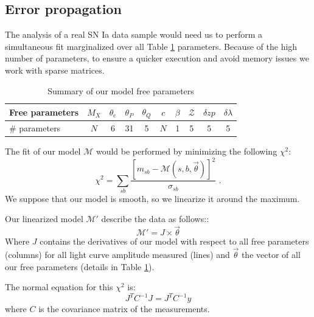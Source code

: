 \documentclass[\docopts]{\docclass}
\begin{document}

\subsection{Error propagation}
\label{sec::linalg}

The analysis of a real SN Ia data sample would need us to perform a simultaneous fit marginalized over all Table \ref{tab:params} parameters. Because of the high number of parameters, to ensure a quicker execution and avoid memory issues we work with sparse matrices.

\begin{table}[t]
\begin{center}
\label{tab:params}
\caption{Summary of our model free parameters}
\begin{tabular}{l|ccccccccc}
\hline
\hline
Free parameters & $M_X$ & $\theta_\text{c}$ & $\theta_P$ & $\theta_Q$ & $c$ & $\beta$ & $\mathcal{Z}$ & $\delta zp$ & $\delta \lambda$ \\
\hline
\# parameters & $N$ & 6 & 31 & 5 & $N$ & 1 & 5 & 5 & 5 \\
\hline
\end{tabular}
\end{center}
\end{table}

The fit of our model $\mathcal{M}$ would be performed by minimizing the following $\chi^2$:
\begin{equation}
\chi^2 = \sum_{sb}\frac{[m_{sb} - \mathcal{M}(s, b, \vec\theta)]^2}{\sigma_{sb}} \text{ .}
\end{equation}
We suppose that our model is smooth, so we linearize it around the maximum.

Our linearized model $\mathcal{M'}$ describe the data as follows::
\begin{equation}
\mathcal{M'} = J \times \vec\theta
\end{equation}
Where $J$ contains the derivatives of our model with respect to all free parameters (columns) for all light curve amplitude measured (lines) and $\vec\theta$ the vector of all our free parameters (details in Table \ref{tab:params}).

The normal equation for this $\chi^2$ is:
\begin{equation}
J^TC^{-1}J = J^TC^{-1}y
\end{equation}
where $C$ is the covariance matrix of the measurements.
\end{document}
